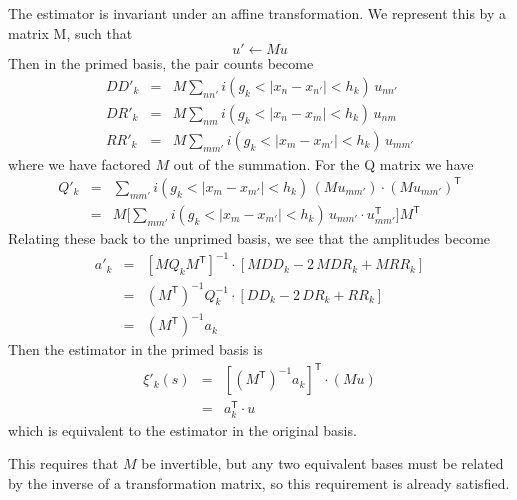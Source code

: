 \documentclass[12pt, letterpaper]{article}
\newcommand{\inv}{^{-1}}
\newcommand{\T}{^{\mathsf{T}}}
\begin{document}
The estimator is invariant under an affine transformation. We represent this by a matrix M, such that 
\begin{equation}
u' \leftarrow Mu
\end{equation}
Then in the primed basis, the pair counts become
\begin{eqnarray}\displaystyle
DD'_k &=& M\sum_{n n'} i(g_k < |x_n - x_{n'}| < h_k)\,u_{n n'}
\\
DR'_k &=& M\sum_{n m} i(g_k < |x_n - x_m| < h_k)\,u_{n m}
\\
RR'_k &=& M\sum_{m m'} i(g_k < |x_m - x_{m'}| < h_k)\,u_{m m'}
\end{eqnarray}
where we have factored $M$ out of the summation. For the Q matrix we have
\begin{eqnarray}\displaystyle
Q'_k &=& \sum_{m m'} i(g_k < |x_m - x_{m'}| < h_k)\,(Mu_{m m'}) \cdot (Mu_{m m'})\T \\
&=& M\Bigg[ \sum_{m m'} i(g_k < |x_m - x_{m'}| < h_k)\,u_{m m'} \cdot u_{m m'}\T \Bigg]M\T
\end{eqnarray}
Relating these back to the unprimed basis, we see that the amplitudes become
\begin{eqnarray}\displaystyle
a'_k &=& [M Q_k M\T]\inv \cdot [MDD_k - 2\,MDR_k + MRR_k] \\
&=& (M\T)\inv Q_k\inv \cdot [DD_k - 2\,DR_k + RR_k] \\
&=& (M\T)\inv a_k
\end{eqnarray}
Then the estimator in the primed basis is 
\begin{eqnarray}\displaystyle
\xi'_k(s) &=& [(M\T)\inv a_k]\T \cdot (Mu) \\
&=& a_k\T \cdot u
\end{eqnarray}
which is equivalent to the estimator in the original basis.

This requires that $M$ be invertible, but any two equivalent bases must be related by the inverse of a transformation matrix, so this requirement is already satisfied.
\end{document}
